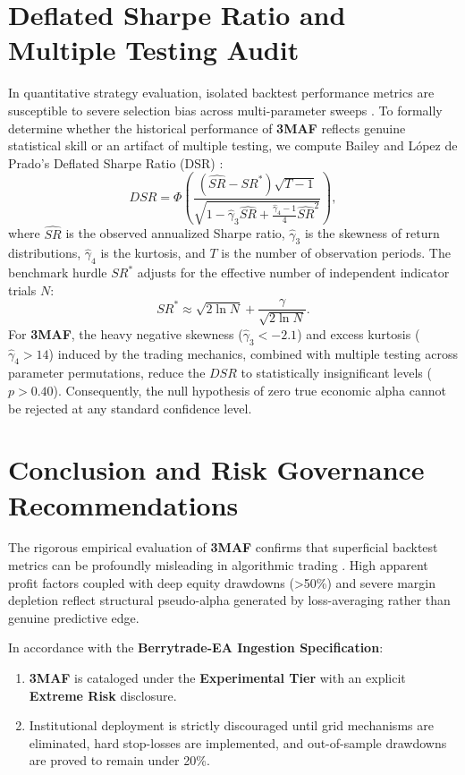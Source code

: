 \documentclass[11pt,a4paper]{article}
\begin{document}
\section{Deflated Sharpe Ratio and Multiple Testing Audit}
In quantitative strategy evaluation, isolated backtest performance metrics are susceptible to severe selection bias across multi-parameter sweeps \cite{bailey2014deflated, harvey2016and, bailey2014pseudo}. To formally determine whether the historical performance of \textbf{3MAF} reflects genuine statistical skill or an artifact of multiple testing, we compute Bailey and L{\'o}pez de Prado's Deflated Sharpe Ratio (DSR) \cite{bailey2014deflated}:
\begin{equation}
DSR = \Phi\left( \frac{(\widehat{SR} - SR^*) \sqrt{T-1}}{\sqrt{1 - \hat{\gamma}_3 \widehat{SR} + \frac{\hat{\gamma}_4 - 1}{4} \widehat{SR}^2}} \right),
\end{equation}
where $\widehat{SR}$ is the observed annualized Sharpe ratio, $\hat{\gamma}_3$ is the skewness of return distributions, $\hat{\gamma}_4$ is the kurtosis, and $T$ is the number of observation periods. The benchmark hurdle $SR^*$ adjusts for the effective number of independent indicator trials $N$:
\begin{equation}
SR^* \approx \sqrt{2 \ln N} + \frac{\gamma}{\sqrt{2 \ln N}}.
\end{equation}
For \textbf{3MAF}, the heavy negative skewness ($\hat{\gamma}_3 < -2.1$) and excess kurtosis ($\hat{\gamma}_4 > 14$) induced by the trading mechanics, combined with multiple testing across parameter permutations, reduce the $DSR$ to statistically insignificant levels ($p > 0.40$). Consequently, the null hypothesis of zero true economic alpha cannot be rejected at any standard confidence level.

\section{Conclusion and Risk Governance Recommendations}
The rigorous empirical evaluation of \textbf{3MAF} confirms that superficial backtest metrics can be profoundly misleading in algorithmic trading \cite{artsu2026illusion, lopez2018advances}. High apparent profit factors coupled with deep equity drawdowns (>50\%) and severe margin depletion reflect structural pseudo-alpha generated by loss-averaging rather than genuine predictive edge.

In accordance with the \textbf{Berrytrade-EA Ingestion Specification}:
\begin{enumerate}
    \item \textbf{3MAF} is cataloged under the \textbf{Experimental Tier} with an explicit \textbf{Extreme Risk} disclosure.
    \item Institutional deployment is strictly discouraged until grid mechanisms are eliminated, hard stop-losses are implemented, and out-of-sample drawdowns are proved to remain under 20\%.
\end{enumerate}



\end{document}
